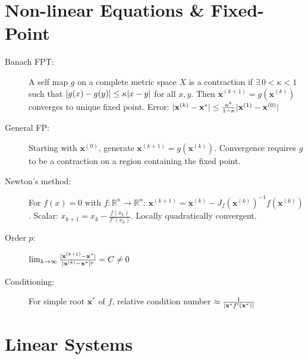 \documentclass[a4paper,10pt,landscape]{article}
\newcommand{\R}{\mathbb{R}}
\DeclarePairedDelimiter{\abs}{\lvert}{\rvert}
\begin{document}
\begin{multicols*}{3}
    \section*{Non-linear Equations \& Fixed-Point}
    \begin{description}
        \item[Banach FPT:] A self map $g$ on a complete metric space $X$ is a contraction if $\exists\, 0<\kappa<1$ such that $\abs{g(x)-g(y)} \leq \kappa\abs{x-y}$ for all $x,y$. Then $\mathbf{x}^{(k+1)}=g(\mathbf{x}^{(k)})$ converges to unique fixed point. Error: $\abs{\mathbf{x}^{(k)}-\mathbf{x}^*} \leq \frac{\kappa^k}{1-\kappa}\abs{\mathbf{x}^{(1)}-\mathbf{x}^{(0)}}$
        \item[General FP:] Starting with $\mathbf{x}^{(0)}$, generate $\mathbf{x}^{(k+1)} = g(\mathbf{x}^{(k)})$. Convergence requires $g$ to be a contraction on a region containing the fixed point.
        \item[Newton's method:] For $f(x)=0$ with $f: \R^n\to\R^n$: $\mathbf{x}^{(k+1)} = \mathbf{x}^{(k)} - J_f(\mathbf{x}^{(k)})^{-1}f(\mathbf{x}^{(k)})$. Scalar: $x_{k+1} = x_k - \frac{f(x_k)}{f'(x_k)}$. Locally quadratically convergent.
        \item[Order $p$:] $\lim_{k\to\infty} \frac{\abs{\mathbf{x}^{(k+1)}-\mathbf{x}^*}}{\abs{\mathbf{x}^{(k)}-\mathbf{x}^*}^p} = C \neq 0$
        \item[Conditioning:] For simple root $\mathbf{x}^*$ of $f$, relative condition number $\approx \frac{1}{\abs{\mathbf{x}^* f'(\mathbf{x}^*)}}$
    \end{description}

    \section*{Linear Systems}

\end{multicols*}
\end{document}
